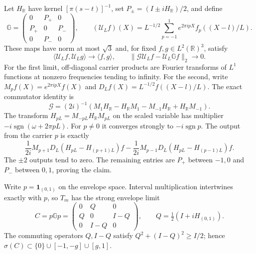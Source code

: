 Let $H_{\mathbb R}$ have kernel $[\pi(s-t)]^{-1}$, set
$P_\pm=(I\pm iH_{\mathbb R})/2$, and define
\[
 \mathbb G=\begin{pmatrix}0&P_+&0\\P_+&0&P_-\\0&P_-&0\end{pmatrix},
 \qquad
 (\mathcal U_Lf)(X)=L^{-1/2}\sum_{p=-1}^1
              e^{2\pi ipX}f_p((X-l)/L).
\]
These maps have norm at most $\sqrt3$ and, for fixed $f,g\in L^2(\mathbb R)^3$, satisfy
\begin{equation}\label{v13:eq:three-channel-transfer}
 \langle\mathcal U_Lf,\mathcal U_Lg\rangle\to\langle f,g\rangle,
 \qquad \|\mathcal G\mathcal U_Lf-\mathcal U_L\mathbb Gf\|_2\to0.
\end{equation}
For the first limit, off-diagonal carrier products are Fourier
transforms of $L^1$ functions at nonzero frequencies tending to infinity.
For the second, write $M_pf(X)=e^{2\pi ipX}f(X)$ and
$D_Lf(X)=L^{-1/2}f((X-l)/L)$.  The exact commutator identity is
\[
 \mathcal G=(2i)^{-1}
       (M_1H_{\mathbb R}-H_{\mathbb R}M_1
        -M_{-1}H_{\mathbb R}+H_{\mathbb R}M_{-1}).
\]
The transform $H_{pL}=M_{-pL}H_{\mathbb R}M_{pL}$ on the scaled
variable has multiplier $-i\operatorname{sgn}(\omega+2\pi pL)$.
For $p\ne0$ it converges strongly to $-i\operatorname{sgn}p$.
The output from the carrier $p$ is exactly
\[
 \frac1{2i}M_{p+1}D_L(H_{pL}-H_{(p+1)L})f
 -\frac1{2i}M_{p-1}D_L(H_{pL}-H_{(p-1)L})f.
\]
The $\pm2$ outputs tend to zero.  The remaining entries are $P_+$
between $-1,0$ and $P_-$ between $0,1$, proving the claim.

Write $p=\mathbf1_{(0,1)}$ on the envelope space.  Interval
multiplication intertwines exactly with $p$, so $T_m$ has the strong
envelope limit
\begin{equation}\label{v13:eq:interval-star}
 C=p\mathbb Gp=\begin{pmatrix}0&Q&0\\Q&0&I-Q\\0&I-Q&0\end{pmatrix},
 \qquad Q=\tfrac12(I+iH_{(0,1)}).
\end{equation}
The commuting operators $Q,I-Q$ satisfy
$Q^2+(I-Q)^2\ge I/2$; hence
$\sigma(C)\subset\{0\}\cup[-1,-g]\cup[g,1]$.


